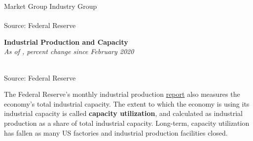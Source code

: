 \documentclass{report}
\newcommand{\tbllink}[1]{\href{https://raw.githubusercontent.com/bdecon/US-chartbook/master/chartbook/data/#1}{\faTable}}
\newcommand{\barylab}[2]{yticklabel style={text width=#1, align=right, 
		style={black!70}, text height=#2},}
\newcommand{\bbar}[2]{extra #1 ticks = {{#2}}, extra #1 tick labels = ,
		extra #1 tick style = {grid=major, grid style={thick, black!25}},}
\newcommand{\barplotnogrid}{xbar=0pt, axis line style={draw=none},
	    yticklabel style={align=left, anchor=east},
      		xmajorticks=false, ymajorgrids=false,   
	    ytick=data, tickwidth=0pt, area legend, reverse legend,
	    nodes near coords, nodes near coords align={horizontal},}
\begin{document}
{\begin{minipage}{0.76\textwidth}
\normalsize \hspace{14mm} Market Group \hspace{38mm} Industry Group \footnotesize \\
\\
\footnotesize{Source: Federal Reserve} \hfill \tbllink{indprogr_rec.csv}
\end{minipage}
\newpage
\begin{minipage}{0.32\textwidth}
\small 
\end{minipage} \hspace{6mm}
\begin{minipage}{0.44\textwidth}
\normalsize \textbf{Industrial Production and Capacity}\\
\footnotesize{\textit{As of \unskip, percent change since February 2020}}\\
\hspace*{-4mm} \\
\footnotesize{Source: Federal Reserve} \hfill \tbllink{ip_comp.csv}
\end{minipage}
\vspace{2mm}

\begin{minipage}{0.76\textwidth}
\small The Federal Reserve's monthly industrial production \href{https://www.federalreserve.gov/releases/g17/}{report} also measures the economy's total industrial capacity. The extent to which the economy is using its industrial capacity is called \textbf{capacity utilization}, and calculated as industrial production as a share of total industrial capacity. Long-term, capacity utilization has fallen as many US factories and industrial production facilities closed. 
\vspace{2mm}


\end{minipage}}
\end{document}
